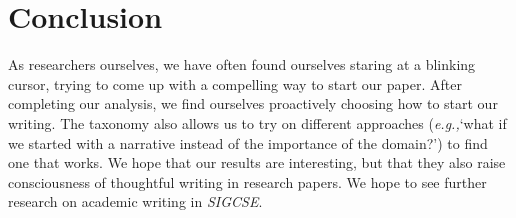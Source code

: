 \documentclass[sigconf]{acmart}
\newcommand{\eg}{\textit{e.g.,}\xspace}
\begin{document}
	\section{Conclusion}

	As researchers ourselves, we have often found ourselves staring at a blinking cursor, trying to come up with a compelling way to start our paper. After completing our analysis, we find ourselves proactively choosing how to start our writing. The taxonomy also allows us to try on different approaches (\eg `what if we started with a narrative instead of the importance of the domain?') to find one that works. We hope that our results are interesting, but that they also raise consciousness of thoughtful writing in research papers. We hope to see further research on academic writing in \textit{SIGCSE}.

	


	
	
\end{document}
